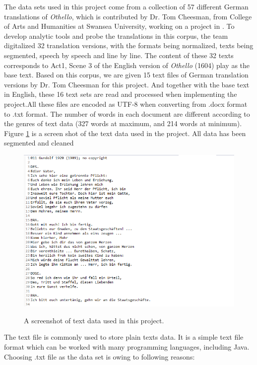 The data sets used in this project come from a collection of 57 different German translations of \emph{Othello}, which is contributed by Dr. Tom Cheesman, from College of Arts and Humanities at Swansea University, working on a project in \cite{Tom2012}. To develop analytic tools and probe the translations in this corpus, the team digitalized 32 translation versions, with the formats being normalized, texts being segmented, speech by speech and line by line. The content of these 32 texts corresponds to Act1, Scene 3 of the English version of \emph{Othello} (1604) play as the base text. Based on this corpus, we are given 15 text files of German translation versions by Dr. Tom Cheesman for this project. And together with the base text in English, these 16 text sets are read and processed when implementing the project.All these files are encoded as UTF-8 when converting from .docx format to .txt format. The number of words in each document are different according to the genres of text data (327 words at maximum, and 214 words at minimum). Figure \ref{fig:dataExample} is a screen shot of the text data used in the project. All data has been segmented and cleaned
\begin{figure}[H]
	\centering    
	\includegraphics[scale=0.8]{Figs/Data-example}\\[1ex]
	\caption{A screenshot of text data used in this project.}
	\label{fig:dataExample}
\end{figure}
The text file is commonly used to store plain texts data. It is a simple text file format which can be worked with many programming languages, including Java. Choosing .txt file as the data set is owing to following reasons:

